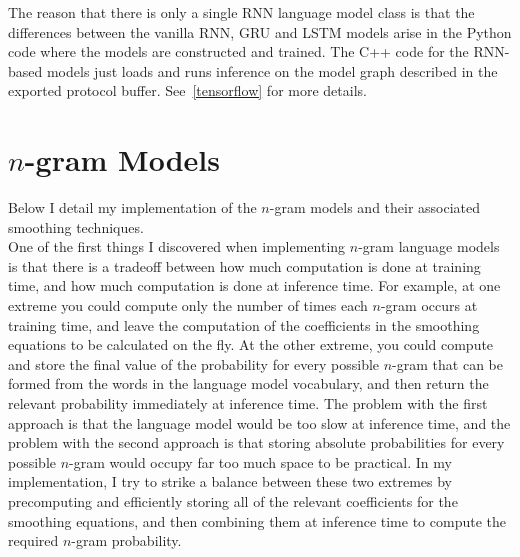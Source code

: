 \documentclass[a4paper, 12pt]{report}
\begin{document}
The reason that there is only a single RNN language model class is that the differences between the vanilla RNN, GRU and LSTM models arise in the Python code where the models are constructed and trained. The C++ code for the RNN-based models just loads and runs inference on the model graph described in the exported protocol buffer. See~\ref{tensorflow} for more details.

\section{$n$-gram Models} \label{ngram_lm}

Below I detail my implementation of the $n$-gram models and their associated smoothing techniques. \\

One of the first things I discovered when implementing $n$-gram language models is that there is a tradeoff between how much computation is done at training time, and how much computation is done at inference time. For example, at one extreme you could compute only the number of times each $n$-gram occurs at training time, and leave the computation of the coefficients in the smoothing equations to be calculated on the fly. At the other extreme, you could compute and store the final value of the probability for every possible $n$-gram that can be formed from the words in the language model vocabulary, and then return the relevant probability immediately at inference time. The problem with the first approach is that the language model would be too slow at inference time, and the problem with the second approach is that storing absolute probabilities for every possible $n$-gram would occupy far too much space to be practical. In my implementation, I try to strike a balance between these two extremes by precomputing and efficiently storing all of the relevant coefficients for the smoothing equations, and then combining them at inference time to compute the required $n$-gram probability. \\
\end{document}
